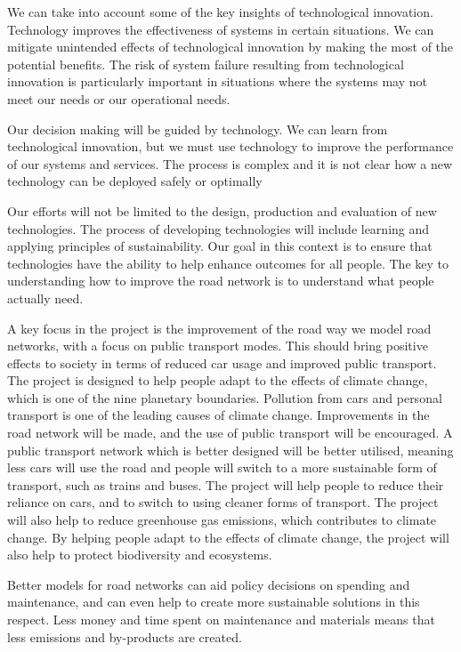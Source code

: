 \documentclass[11pt]{article}
\begin{document}
We can  take into account some of the key insights of technological innovation. Technology improves the effectiveness of systems in certain situations. We can mitigate unintended effects of technological innovation by making the most of the potential benefits. The risk of system failure resulting from technological innovation is particularly important in situations where the systems may not meet our needs or our operational needs.

Our decision making will be guided by technology. We can learn from technological innovation, but we must use technology to improve the performance of our systems and services. The process is complex and it is not clear how a new technology can be deployed safely or optimally

Our efforts will not be limited to the design, production and evaluation of new technologies. The process of developing technologies will include learning and applying principles of sustainability.  Our goal in this context is to ensure that technologies have the ability to help enhance outcomes for all people. The key to understanding how to improve the road network is to understand what people actually need.

A key focus in the project is the improvement of the road way we model road networks, with a focus on public transport modes. This should bring positive effects  to society in terms of reduced car usage and improved public transport.
The project is designed to help people adapt to the effects of climate change, which is one of the nine planetary boundaries. Pollution from cars and personal transport is one of the leading causes of climate change. Improvements in the road network  will be made, and the use of public transport will be encouraged. A public transport network which is better designed will be better utilised, meaning less cars will use the road and people will switch to a more sustainable form of transport, such as trains and buses. The project will help people to reduce their reliance on cars, and to switch to using cleaner forms of transport. The project will also help to reduce greenhouse gas emissions, which contributes to climate change. By helping people adapt to the effects of climate change, the project will also help to protect biodiversity and ecosystems.

Better models for road networks can aid policy decisions  on spending and maintenance, and can even help to create more sustainable solutions in this respect. Less money and time spent on maintenance and materials means that less emissions and by-products are created.
\end{document}
